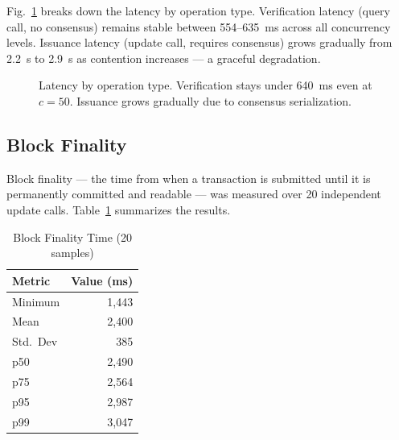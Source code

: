 \documentclass[journal]{IEEEtran}
\begin{document}
Fig.~\ref{fig:conc_lat} breaks down the latency by operation type. Verification latency (query call, no consensus) remains stable between 554--635~ms across all concurrency levels. Issuance latency (update call, requires consensus) grows gradually from 2.2~s to 2.9~s as contention increases — a graceful degradation.

\begin{figure}[t]
\centering
{}
\caption{Latency by operation type. Verification stays under 640~ms even at $c = 50$. Issuance grows gradually due to consensus serialization.}
\label{fig:conc_lat}
\end{figure}

\subsection{Block Finality}

Block finality — the time from when a transaction is submitted until it is permanently committed and readable — was measured over 20 independent update calls. Table~\ref{tab:finality} summarizes the results.

\begin{table}[t]
\caption{Block Finality Time (20 samples)}
\label{tab:finality}
\centering\small\renewcommand{\arraystretch}{1.1}
\begin{tabular}{@{}lr@{}}
\toprule
\textbf{Metric} & \textbf{Value (ms)} \\
\midrule
Minimum   & 1{,}443 \\
Mean      & 2{,}400 \\
Std.\ Dev    & 385 \\
p50       & 2{,}490 \\
p75       & 2{,}564 \\
p95       & 2{,}987 \\
p99       & 3{,}047 \\
\bottomrule
\end{tabular}
\end{table}
\end{document}
